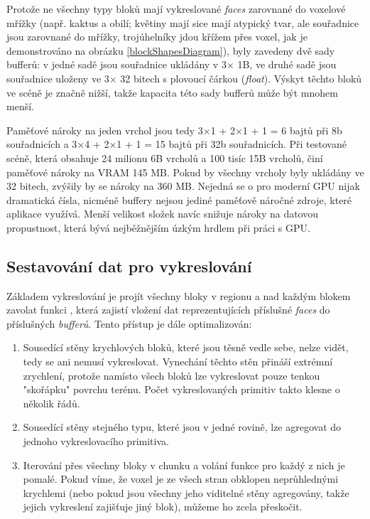 Protože ne všechny typy bloků mají vykreslované \textit{faces} zarovnané do voxelové mřížky (např. kaktus a obilí; květiny mají sice mají atypický tvar, ale souřadnice jsou zarovnané do mřížky, trojúhelníky jdou křížem přes voxel, jak je demonstrováno na obrázku \ref{blockShapesDiagram}), byly zavedeny dvě sady bufferů: v jedné sadě jsou souřadnice ukládány v 3× 1B, ve druhé sadě jsou souřadnice uloženy ve 3× 32 bitech s plovoucí čárkou (\textit{float}). Výskyt těchto bloků ve scéně je značně nižší, takže kapacita této sady bufferů může být mnohem menší.


Paměťové nároky na jeden vrchol jsou tedy 3×1 + 2×1 + 1 = 6 bajtů při 8b souřadnicích a 3×4 + 2×1 + 1 = 15 bajtů při 32b souřadnicích. Při testované scéně, která obsahuje 24 milionu 6B vrcholů a 100 tisíc 15B vrcholů, činí paměťové nároky na VRAM 145 MB. Pokud by všechny vrcholy byly ukládány ve 32 bitech, zvýšily by se nároky na 360 MB. Nejedná se o pro moderní GPU nijak dramatická čísla, nicméně buffery nejsou jediné paměťově náročné zdroje, které aplikace využívá. Menší velikost složek navíc snižuje nároky na datovou propustnost, která bývá nejběžnějším úzkým hrdlem při práci s GPU.

\subsection{Sestavování dat pro vykreslování} \label{buildDrawData}
Základem vykreslování je projít všechny bloky v regionu a nad každým blokem zavolat funkci , která zajistí vložení dat reprezentujících příslušné \textit{faces} do příslušných \textit{bufferů}. Tento přístup je dále optimalizován:

\begin{enumerate}
	\item Sousedící stěny krychlových bloků, které jsou těsně vedle sebe, nelze vidět, tedy se ani nemusí vykreslovat. Vynechání těchto stěn přináší extrémní zrychlení, protože namísto všech bloků lze vykreslovat pouze tenkou "skořápku" povrchu terénu. Počet vykreslovaných primitiv takto klesne o několik řádů.
	
	\item Sousedící stěny stejného typu, které jsou v jedné rovině, lze agregovat do jednoho vykreslovacího primitiva.
	
	\item Iterování přes všechny bloky v chunku a volání funkce  pro každý z nich je pomalé. Pokud víme, že voxel je ze všech stran obklopen neprůhlednými krychlemi (nebo pokud jsou všechny jeho viditelné stěny agregovány, takže jejich vykreslení zajišťuje jiný blok), můžeme ho zcela přeskočit.
\end{enumerate}

